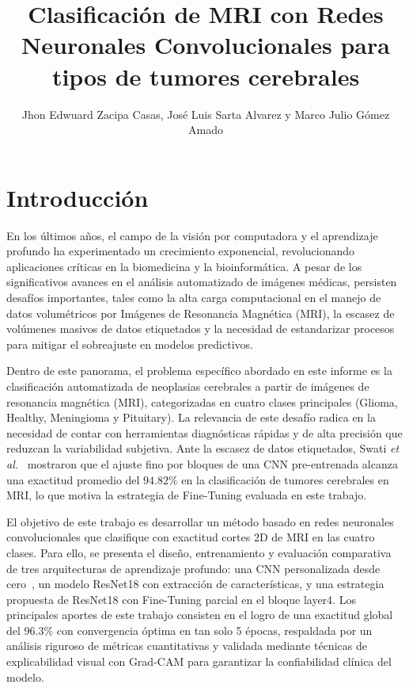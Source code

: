 \documentclass[letterpaper, 10 pt, conference]{ieeeconf}  %
\title{\LARGE \bf
Clasificación de MRI con Redes Neuronales Convolucionales para tipos de tumores cerebrales  
}
\author{Jhon Edwuard Zacipa Casas, José Luis Sarta Alvarez  y Marco Julio Gómez Amado }
\begin{document}
\maketitle
\thispagestyle{empty}
\pagestyle{empty}



\section{Introducción}

En los últimos años, el campo de la visión por computadora y el aprendizaje profundo ha experimentado un crecimiento exponencial, revolucionando aplicaciones críticas en la biomedicina y la bioinformática. A pesar de los significativos avances en el análisis automatizado de imágenes médicas, persisten desafíos importantes, tales como la alta carga computacional en el manejo de datos volumétricos por Imágenes de Resonancia Magnética (MRI), la escasez de volúmenes masivos de datos etiquetados y la necesidad de estandarizar procesos para mitigar el sobreajuste en modelos predictivos.

Dentro de este panorama, el problema específico abordado en este informe es la clasificación automatizada de neoplasias cerebrales a partir de imágenes de resonancia magnética (MRI), categorizadas en cuatro clases principales (Glioma, Healthy, Meningioma y Pituitary). La relevancia de este desafío radica en la necesidad de contar con herramientas diagnósticas rápidas y de alta precisión que reduzcan la variabilidad subjetiva. Ante la escasez de datos etiquetados, Swati \textit{et al.}~\cite{swati2019} mostraron que el ajuste fino por bloques de una CNN pre-entrenada alcanza una exactitud promedio del $94.82\%$ en la clasificación de tumores cerebrales en MRI, lo que motiva la estrategia de Fine-Tuning evaluada en este trabajo. 

El objetivo de este trabajo es desarrollar un método basado en redes neuronales convolucionales que clasifique con exactitud cortes 2D de MRI en las cuatro clases. Para ello, se presenta el diseño, entrenamiento y evaluación comparativa de tres arquitecturas de aprendizaje profundo: una CNN personalizada desde cero~\cite{c1}, un modelo ResNet18 con extracción de características, y una estrategia propuesta de ResNet18 con Fine-Tuning parcial en el bloque layer4. Los principales aportes de este trabajo consisten en el logro de una exactitud global del $96.3\%$ con convergencia óptima en tan solo 5 épocas, respaldada por un análisis riguroso de métricas cuantitativas y validada mediante técnicas de explicabilidad visual con Grad-CAM para garantizar la confiabilidad clínica del modelo.
\end{document}
